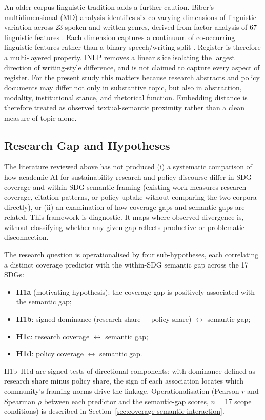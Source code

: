 \documentclass[12pt,a4paper]{article}
\begin{document}
 An older corpus-linguistic tradition adds a further caution. Biber's multidimensional (MD) analysis identifies six co-varying dimensions of linguistic variation across 23 spoken and written genres, derived from factor analysis of 67 linguistic features \parencite{biber1988variation}. Each dimension captures a continuum of co-occurring linguistic features rather than a binary speech/writing split \parencite{biber1988variation, biberConrad2009register}. Register is therefore a multi-layered property. INLP removes a linear slice isolating the largest direction of writing-style difference, and is not claimed to capture every aspect of register. For the present study this matters because research abstracts and policy documents may differ not only in substantive topic, but also in abstraction, modality, institutional stance, and rhetorical function. Embedding distance is therefore treated as observed textual-semantic proximity rather than a clean measure of topic alone.

\subsection{Research Gap and Hypotheses}\label{sec:hypotheses}

The literature reviewed above has not produced (i) a systematic comparison of how academic AI-for-sustainability research and policy discourse differ in SDG coverage and within-SDG semantic framing (existing work measures research coverage, citation patterns, or policy uptake without comparing the two corpora directly), or (ii) an examination of how coverage gaps and semantic gaps are related. This framework is diagnostic. It maps where observed divergence is, without classifying whether any given gap reflects productive or problematic disconnection.

The research question is operationalised by four sub-hypotheses, each correlating a distinct coverage predictor with the within-SDG semantic gap across the 17 SDGs:
\begin{itemize}
  \item \textbf{H1a} (motivating hypothesis): the coverage gap is positively associated with the semantic gap;
  \item \textbf{H1b}: signed dominance (research share $-$ policy share) $\leftrightarrow$ semantic gap;
  \item \textbf{H1c}: research coverage $\leftrightarrow$ semantic gap;
  \item \textbf{H1d}: policy coverage $\leftrightarrow$ semantic gap.
\end{itemize}
H1b--H1d are signed tests of directional components: with dominance defined as research share minus policy share, the sign of each association locates which community's framing norms drive the linkage. Operationalisation (Pearson $r$ and Spearman $\rho$ between each predictor and the semantic-gap scores, $n = 17$ scope conditions) is described in Section~\ref{sec:coverage-semantic-interaction}.
\end{document}
